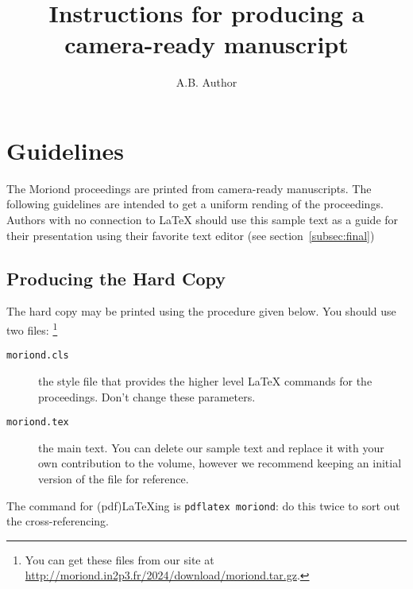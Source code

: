 \documentclass{moriond}
\begin{document}
\vspace*{4cm}
\title{Instructions for producing a camera-ready manuscript}


\author{ A.B. Author }

\address{Department of Physics, Theoretical Physics, 1 Keble Road,\\
Oxford OX1 3NP, England}

\maketitle{}

\section{Guidelines}

The Moriond proceedings are printed from camera-ready manuscripts.
The following guidelines are intended to get a uniform rending of the 
proceedings. Authors with no connection to \LaTeX{} should use this
sample text as a guide for their presentation using their favorite
text editor (see section~\ref{subsec:final})

\subsection{Producing the Hard Copy}\label{subsec:prod}

The hard copy may be printed using the procedure given below.
You should use
two files: \footnote{You can get these files from
our site at \url{http://moriond.in2p3.fr/2024/download/moriond.tar.gz}.}
\begin{description}
\item[\texttt{moriond.cls}] the style file that provides the higher
level \LaTeX{} commands for the proceedings. Don't change these parameters.
\item[\texttt{moriond.tex}] the main text. You can delete our sample
text and replace it with your own contribution to the volume, however we
recommend keeping an initial version of the file for reference.
\end{description}
The command for (pdf)\LaTeX ing is \texttt{pdflatex moriond}: do this twice to
sort out the cross-referencing.
\end{document}
